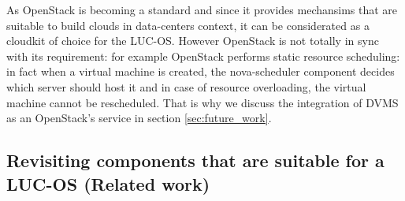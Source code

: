 As OpenStack is becoming a standard and since it provides mechansims that are
suitable to build clouds in data-centers context, it can be considerated as a
cloudkit of choice for the LUC-OS. However OpenStack is not totally in sync with
its requirement: for example OpenStack performs static resource scheduling: in 
fact when a virtual machine is created, the nova-scheduler component decides 
which server should host it and in case of resource overloading, the virtual
machine cannot be rescheduled. That is why we discuss the integration of DVMS as
an OpenStack's service in section \ref{sec:future_work}.

\subsection{Revisiting components that are suitable for a LUC-OS (Related work)}
\label{sub:sec:revisiting_openstack}









